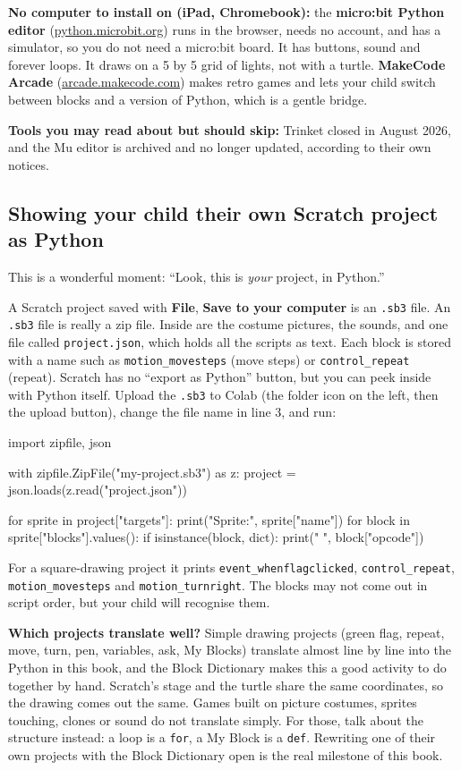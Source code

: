 \textbf{No computer to install on (iPad, Chromebook):} the \textbf{micro:bit Python editor} (\url{python.microbit.org}) runs in the browser, needs no account, and has a simulator, so you do not need a micro:bit board. It has buttons, sound and forever loops. It draws on a 5 by 5 grid of lights, not with a turtle. \textbf{MakeCode Arcade} (\url{arcade.makecode.com}) makes retro games and lets your child switch between blocks and a version of Python, which is a gentle bridge.

\textbf{Tools you may read about but should skip:} Trinket closed in August 2026, and the Mu editor is archived and no longer updated, according to their own notices.

\subsection*{Showing your child their own Scratch project as Python}

This is a wonderful moment: ``Look, this is \emph{your} project, in Python.''

A Scratch project saved with \textbf{File}, \textbf{Save to your computer} is an \texttt{.sb3} file. An \texttt{.sb3} file is really a zip file. Inside are the costume pictures, the sounds, and one file called \texttt{project.json}, which holds all the scripts as text. Each block is stored with a name such as \texttt{motion\_movesteps} (move steps) or \texttt{control\_repeat} (repeat). Scratch has no ``export as Python'' button, but you can peek inside with Python itself. Upload the \texttt{.sb3} to Colab (the folder icon on the left, then the upload button), change the file name in line 3, and run:

\begin{code}
import zipfile, json

with zipfile.ZipFile("my-project.sb3") as z:
    project = json.loads(z.read("project.json"))

for sprite in project["targets"]:
    print("Sprite:", sprite["name"])
    for block in sprite["blocks"].values():
        if isinstance(block, dict):
            print("   ", block["opcode"])
\end{code}

For a square-drawing project it prints \texttt{event\_whenflagclicked}, \texttt{control\_repeat}, \texttt{motion\_movesteps} and \texttt{motion\_turnright}. The blocks may not come out in script order, but your child will recognise them.

\textbf{Which projects translate well?} Simple drawing projects (green flag, repeat, move, turn, pen, variables, ask, My Blocks) translate almost line by line into the Python in this book, and the Block Dictionary makes this a good activity to do together by hand. Scratch's stage and the turtle share the same coordinates, so the drawing comes out the same. Games built on picture costumes, sprites touching, clones or sound do not translate simply. For those, talk about the structure instead: a loop is a \texttt{for}, a My Block is a \texttt{def}. Rewriting one of their own projects with the Block Dictionary open is the real milestone of this book.

